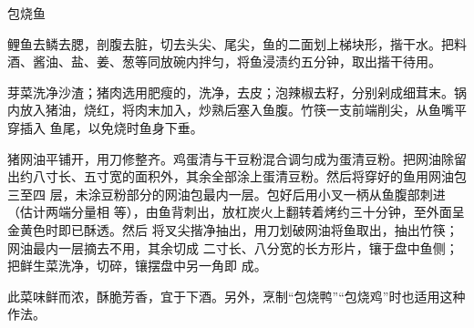 \begin{recipe}{包烧鱼}

\ingredients


\preparation

\step 鲤鱼去鳞去腮，剖腹去脏，切去头尖、尾尖，鱼的二面划上梯块形，揩干水。把料
酒、酱油、盐、姜、葱等同放碗内拌匀，将鱼浸渍约五分钟，取出揩干待用。

\step 芽菜洗净沙渣；猪肉选用肥瘦的，洗净，去皮；泡辣椒去籽，分别剁成细茸末。锅
内放入猪油，烧红，将肉末加入，炒熟后塞入鱼腹。竹筷一支前端削尖，从鱼嘴平穿插入
鱼尾，以免烧时鱼身下垂。

\step 猪网油平铺开，用刀修整齐。鸡蛋清与干豆粉混合调匀成为蛋清豆粉。把网油除留
出约八寸长、五寸宽的面积外，其余全部涂上蛋清豆粉。然后将穿好的鱼用网油包三至四
层，未涂豆粉部分的网油包最内一层。包好后用小叉一柄从鱼腹部刺进（估计两端分量相
等），由鱼背刺出，放杠炭火上翻转着烤约三十分钟，至外面呈金黄色时即已酥透。然后
将叉尖揩净抽出，用刀划破网油将鱼取出，抽出竹筷；网油最内一层摘去不用，其余切成
二寸长、八分宽的长方形片，镶于盘中鱼侧；把鲜生菜洗净，切碎，镶摆盘中另一角即
成。

\features

此菜味鲜而浓，酥脆芳香，宜于下酒。另外，烹制“包烧鸭”“包烧鸡”时也适用这种作法。

\end{recipe}

